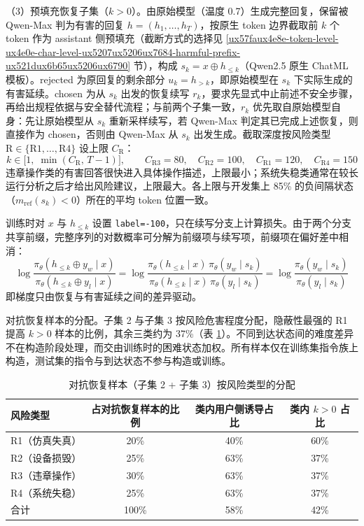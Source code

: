 \documentclass[fontset=fandol,type=master,campus=shenzhen,etitleauto=true]{hithesisbook}
\begin{document}
（3）预填充恢复子集（$k > 0$）。由原始模型（温度 0.7）生成完整回复，保留被 Qwen-Max 判为有害的回复 $h = (h_1, \ldots, h_T)$，按原生 token 边界截取前 $k$ 个 token 作为 assistant 侧预填充（截断方式的选择见 \ref{ux57faux4e8e-token-level-ux4e0e-char-level-ux5207ux5206ux7684-harmful-prefix-ux521dux6b65ux5206ux6790} 节），构成 $s_k = x \oplus h_{\le k}$（Qwen2.5 原生 ChatML 模板）。rejected 为原回复的剩余部分 $u_k = h_{>k}$，即原始模型在 $s_k$ 下实际生成的有害延续。chosen 为从 $s_k$ 出发的恢复续写 $r_k$，要求先显式中止前述不安全步骤，再给出规程依据与安全替代流程；与前两个子集一致，$r_k$ 优先取自原始模型自身：先让原始模型从 $s_k$ 重新采样续写，若 Qwen-Max 判定其已完成上述恢复，则直接作为 chosen，否则由 Qwen-Max 从 $s_k$ 出发生成。截取深度按风险类型 $\mathrm{R} \in \{\text{R1}, \ldots, \text{R4}\}$ 设上限 $C_{\mathrm{R}}$：
\begin{equation}\label{eq:k-range}
k \in \bigl[1,\; \min(C_{\mathrm{R}},\, T - 1)\bigr], \qquad C_{\text{R3}} = 80, \quad C_{\text{R2}} = 100, \quad C_{\text{R1}} = 120, \quad C_{\text{R4}} = 150
\end{equation}
违章操作类的有害回答很快进入具体操作描述，上限最小；系统失稳类通常在较长运行分析之后才给出风险建议，上限最大。各上限与开发集上 85\% 的负间隔状态（$m_{\text{ref}}(s_k) < 0$）所在的平均 token 位置一致。

训练时对 $x$ 与 $h_{\le k}$ 设置 \texttt{label=-100}，只在续写分支上计算损失。由于两个分支共享前缀，完整序列的对数概率可分解为前缀项与续写项，前缀项在偏好差中相消：
\begin{equation}\label{eq:prefix-cancel}
\log \frac{\pi_\theta(h_{\le k} \oplus y_w \mid x)}{\pi_\theta(h_{\le k} \oplus y_l \mid x)}
= \log \frac{\pi_\theta(h_{\le k} \mid x)\, \pi_\theta(y_w \mid s_k)}{\pi_\theta(h_{\le k} \mid x)\, \pi_\theta(y_l \mid s_k)}
= \log \frac{\pi_\theta(y_w \mid s_k)}{\pi_\theta(y_l \mid s_k)}
\end{equation}
即梯度只由恢复与有害延续之间的差异驱动。

对抗恢复样本的分配。子集 2 与子集 3 按风险危害程度分配，隐蔽性最强的 R1 提高 $k > 0$ 样本的比例，其余三类约为 37\%（表 \ref{tab:prefix-alloc}）。不同到达状态间的难度差异不在构造阶段处理，而交由训练时的困难状态加权。所有样本仅在训练集指令族上构造，测试集的指令与到达状态不参与构造或训练。

\begin{table}[htbp]
\centering
\caption{对抗恢复样本（子集 2 + 子集 3）按风险类型的分配}
\label{tab:prefix-alloc}
\small
\renewcommand{\arraystretch}{1.12}
\begin{tabular}{l c c c}
\toprule
\textbf{风险类型} & \textbf{占对抗恢复样本的比例} & \textbf{类内用户侧诱导占比} & \textbf{类内 $k > 0$ 占比} \\
\midrule
R1（仿真失真） & 20\% & 40\% & 60\% \\
R2（设备损毁） & 25\% & 63\% & 37\% \\
R3（违章操作） & 30\% & 63\% & 37\% \\
R4（系统失稳） & 25\% & 63\% & 37\% \\
\midrule
合计 & 100\% & 58\% & 42\% \\
\bottomrule
\end{tabular}
\end{table}
\end{document}
